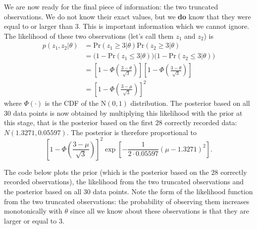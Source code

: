 \documentclass[
  letterpaper,
  DIV=11,
  numbers=noendperiod]{scrartcl}
\begin{document}
\begin{tcolorbox}
We are now ready for the final piece of information: the two truncated
observations. We do not know their exact values, but we \textbf{do} know
that they were equal to or larger than \(3\). This is important
information which we cannot ignore. The likelihood of these two
observations (let's call them \(z_{1}\) and \(z_{2}\)) is \begin{align*}
      p(z_{1},z_{2}\vert\theta) &=\mathrm{Pr}(z_{1}\geq3\vert\theta)\mathrm{Pr}(z_{2}\geq3\vert\theta) \\
      &=\Big(1-\mathrm{Pr}(z_{1}\leq 3\vert\theta)\Big) \Big(1-\mathrm{Pr}(z_{2}\leq3\vert\theta)\Big) \\
      &=\left[1-\Phi\left(\frac{3-\theta}{\sqrt{3}}\right)\right]\left[1-\Phi\left(\frac{3-\theta}{\sqrt{3}}\right)\right]  \\
      &=\left[1-\Phi\left(\frac{3-\mu}{\sqrt{3}}\right)\right]^{2}
    \end{align*} where \(\Phi(\cdot)\) is the CDF of the
\(\mathrm{N}(0,1)\) distribution. The posterior based on all \(30\) data
points is now obtained by multiplying this likelihood with the prior at
this stage, that is the posterior based on the first \(28\) correctly
recorded data: \(N(1.3271,0.05597)\). The posterior is therefore
proportional to \begin{equation*}
      \left[1-\Phi\left(\frac{3-\mu}{\sqrt{3}}\right)\right]^{2}\exp\left[-\frac{1}{2\cdot0.05597}\left(\mu-1.3271\right)^{2}\right].
    \end{equation*}

The code below plots the prior (which is the posterior based on the
\(28\) correctly recorded observations), the likelihood from the two
truncated observations and the posterior based on all \(30\) data
points. Note the form of the likelihood function from the two truncated
observations: the probability of observing them increases monotonically
with \(\theta\) since all we know about these observations is that they
are larger or equal to \(3\).


\end{tcolorbox}
\end{document}
